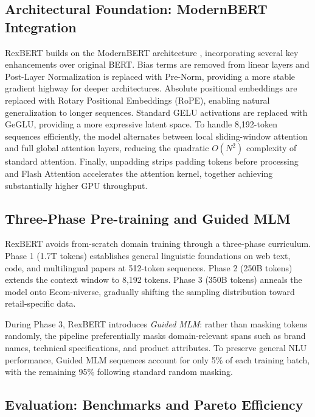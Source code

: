 \documentclass[a4paper,12pt]{article}
\begin{document}
\subsection{Architectural Foundation: ModernBERT Integration}
RexBERT builds on the ModernBERT architecture \citep{warner2025smarter}, incorporating several key enhancements over original BERT. Bias terms are removed from linear layers and Post-Layer Normalization is replaced with Pre-Norm, providing a more stable gradient highway for deeper architectures. Absolute positional embeddings are replaced with Rotary Positional Embeddings (RoPE), enabling natural generalization to longer sequences. Standard GELU activations are replaced with GeGLU, providing a more expressive latent space. To handle 8,192-token sequences efficiently, the model alternates between local sliding-window attention and full global attention layers, reducing the quadratic $O(N^2)$ complexity of standard attention. Finally, unpadding strips padding tokens before processing and Flash Attention accelerates the attention kernel, together achieving substantially higher GPU throughput.

\subsection{Three-Phase Pre-training and Guided MLM}
RexBERT avoids from-scratch domain training through a three-phase curriculum. Phase 1 (1.7T tokens) establishes general linguistic foundations on web text, code, and multilingual papers at 512-token sequences. Phase 2 (250B tokens) extends the context window to 8,192 tokens. Phase 3 (350B tokens) anneals the model onto Ecom-niverse, gradually shifting the sampling distribution toward retail-specific data.

During Phase 3, RexBERT introduces \textit{Guided MLM}: rather than masking tokens randomly, the pipeline preferentially masks domain-relevant spans such as brand names, technical specifications, and product attributes. To preserve general NLU performance, Guided MLM sequences account for only 5\% of each training batch, with the remaining 95\% following standard random masking.

\subsection{Evaluation: Benchmarks and Pareto Efficiency}
\end{document}
